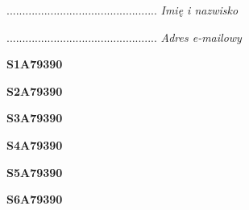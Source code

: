 \begin{turn}{90}\begin{minipage}{\linewidth} \vspace{20mm} ................................................  \textit{Imię i nazwisko}\end{minipage}\end{turn}

\begin{turn}{90}\begin{minipage}{\linewidth} \vspace{20mm} ................................................  \textit{Adres e-mailowy}\end{minipage}\end{turn}

\begin{turn}{90}\huge \begin{minipage}{\linewidth} \vspace{10mm}\textbf{S1A79390}\end{minipage}\end{turn}

\begin{turn}{90}\huge \begin{minipage}{\linewidth} \vspace{10mm}\textbf{S2A79390}\end{minipage}\end{turn}

\begin{turn}{90}\huge \begin{minipage}{\linewidth} \vspace{10mm}\textbf{S3A79390}\end{minipage}\end{turn}

\begin{turn}{90}\huge \begin{minipage}{\linewidth} \vspace{10mm}\textbf{S4A79390}\end{minipage}\end{turn}

\begin{turn}{90}\huge \begin{minipage}{\linewidth} \vspace{10mm}\textbf{S5A79390}\end{minipage}\end{turn}

\begin{turn}{90}\huge \begin{minipage}{\linewidth} \vspace{10mm}\textbf{S6A79390}\end{minipage}\end{turn}

